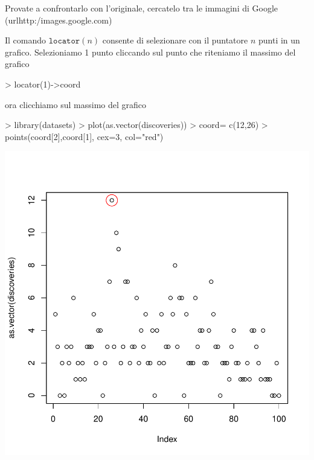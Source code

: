 \documentclass[onecolumn,11pt]{book}
\begin{document}
Provate a confrontarlo con l'originale, cercatelo tra le immagini di Google (url{http:/images.google.com})
 
 
 
 Il comando  $\texttt{locator}(n)$ 
consente di selezionare con il puntatore $n$ punti in un grafico.
Selezioniamo 1 punto cliccando  sul punto che riteniamo il massimo del grafico

\begin{Schunk}
\begin{Sinput}
> locator(1)->coord
\end{Sinput}
\end{Schunk}
 ora clicchiamo sul massimo del grafico

\begin{Schunk}
\begin{Sinput}
> library(datasets)
> plot(as.vector(discoveries))
> coord= c(12,26)
> points(coord[2],coord[1], cex=3, col="red") 
\end{Sinput}
\end{Schunk}
\includegraphics{statisticaconR-396}
\end{document}
